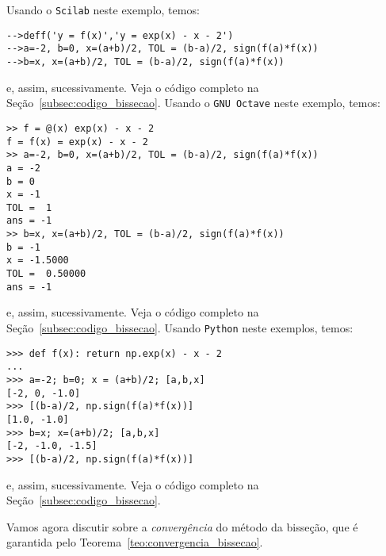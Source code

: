 \begin{sol}
\ifisscilab
Usando o \verb+Scilab+ neste exemplo, temos:
\begin{verbatim}
-->deff('y = f(x)','y = exp(x) - x - 2')
-->a=-2, b=0, x=(a+b)/2, TOL = (b-a)/2, sign(f(a)*f(x))
-->b=x, x=(a+b)/2, TOL = (b-a)/2, sign(f(a)*f(x))
\end{verbatim}
  e, assim, sucessivamente. Veja o código completo na Seção~\ref{subsec:codigo_bissecao}.
\fi
\ifisoctave
Usando o \verb+GNU Octave+ neste exemplo, temos:
\begin{verbatim}
>> f = @(x) exp(x) - x - 2
f = f(x) = exp(x) - x - 2
>> a=-2, b=0, x=(a+b)/2, TOL = (b-a)/2, sign(f(a)*f(x))
a = -2
b = 0
x = -1
TOL =  1
ans = -1
>> b=x, x=(a+b)/2, TOL = (b-a)/2, sign(f(a)*f(x))
b = -1
x = -1.5000
TOL =  0.50000
ans = -1
\end{verbatim}
e, assim, sucessivamente. Veja o código completo na Seção~\ref{subsec:codigo_bissecao}.
\fi
\ifispython
Usando \verb+Python+ neste exemplos, temos:
\begin{verbatim}
>>> def f(x): return np.exp(x) - x - 2
...
>>> a=-2; b=0; x = (a+b)/2; [a,b,x]
[-2, 0, -1.0]
>>> [(b-a)/2, np.sign(f(a)*f(x))]
[1.0, -1.0]
>>> b=x; x=(a+b)/2; [a,b,x]
[-2, -1.0, -1.5]
>>> [(b-a)/2, np.sign(f(a)*f(x))]
\end{verbatim}
e, assim, sucessivamente. Veja o código completo na Seção~\ref{subsec:codigo_bissecao}.
\fi
\end{sol}

Vamos agora discutir sobre a \emph{convergência} do método da bisseção, que é garantida pelo Teorema~\ref{teo:convergencia_bissecao}.

